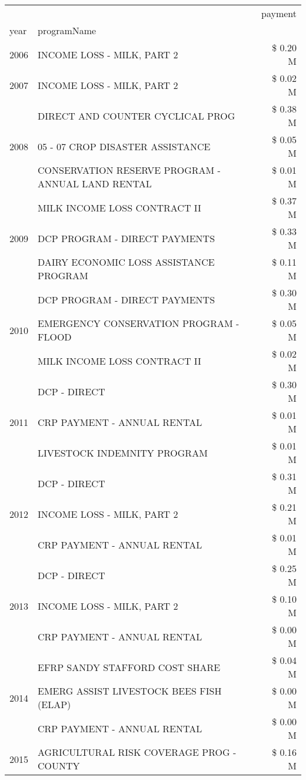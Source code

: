 \begin{tabular}{llr}
\toprule
 &  & payment \\
year & programName &  \\
\midrule
2006 & INCOME LOSS - MILK, PART 2 & \$ 0.20 M \\
\cline{1-3}
2007 & INCOME LOSS - MILK, PART 2 & \$ 0.02 M \\
\cline{1-3}
\multirow[t]{3}{*}{2008} & DIRECT AND COUNTER CYCLICAL PROG & \$ 0.38 M \\
 & 05 - 07 CROP DISASTER ASSISTANCE & \$ 0.05 M \\
 & CONSERVATION RESERVE PROGRAM - ANNUAL LAND RENTAL & \$ 0.01 M \\
\cline{1-3}
\multirow[t]{3}{*}{2009} & MILK INCOME LOSS CONTRACT II & \$ 0.37 M \\
 & DCP PROGRAM - DIRECT PAYMENTS & \$ 0.33 M \\
 & DAIRY ECONOMIC LOSS ASSISTANCE PROGRAM & \$ 0.11 M \\
\cline{1-3}
\multirow[t]{3}{*}{2010} & DCP PROGRAM - DIRECT PAYMENTS & \$ 0.30 M \\
 & EMERGENCY CONSERVATION PROGRAM - FLOOD & \$ 0.05 M \\
 & MILK INCOME LOSS CONTRACT II & \$ 0.02 M \\
\cline{1-3}
\multirow[t]{3}{*}{2011} & DCP - DIRECT & \$ 0.30 M \\
 & CRP PAYMENT - ANNUAL RENTAL & \$ 0.01 M \\
 & LIVESTOCK INDEMNITY PROGRAM & \$ 0.01 M \\
\cline{1-3}
\multirow[t]{3}{*}{2012} & DCP - DIRECT & \$ 0.31 M \\
 & INCOME LOSS - MILK, PART 2 & \$ 0.21 M \\
 & CRP PAYMENT - ANNUAL RENTAL & \$ 0.01 M \\
\cline{1-3}
\multirow[t]{3}{*}{2013} & DCP - DIRECT & \$ 0.25 M \\
 & INCOME LOSS - MILK, PART 2 & \$ 0.10 M \\
 & CRP PAYMENT - ANNUAL RENTAL & \$ 0.00 M \\
\cline{1-3}
\multirow[t]{3}{*}{2014} & EFRP SANDY STAFFORD COST SHARE & \$ 0.04 M \\
 & EMERG ASSIST LIVESTOCK BEES FISH (ELAP) & \$ 0.00 M \\
 & CRP PAYMENT - ANNUAL RENTAL & \$ 0.00 M \\
\cline{1-3}
\multirow[t]{3}{*}{2015} & AGRICULTURAL RISK COVERAGE PROG - COUNTY & \$ 0.16 M \\

\end{tabular}
